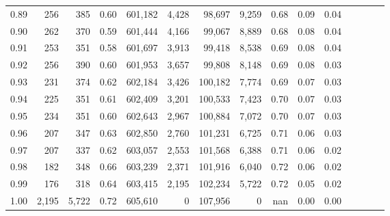 \begin{tabular}{rrrcrrrrrrrrrrr}
0.89 &     256 &    385 &                                       0.60 &  601,182 &    4,428 &   98,697 &    9,259 &  0.68 &  0.09 &                         0.04 \\
0.90 &     262 &    370 &                                       0.59 &  601,444 &    4,166 &   99,067 &    8,889 &  0.68 &  0.08 &                         0.04 \\
0.91 &     253 &    351 &                                       0.58 &  601,697 &    3,913 &   99,418 &    8,538 &  0.69 &  0.08 &                         0.04 \\
0.92 &     256 &    390 &                                       0.60 &  601,953 &    3,657 &   99,808 &    8,148 &  0.69 &  0.08 &                         0.03 \\
0.93 &     231 &    374 &                                       0.62 &  602,184 &    3,426 &  100,182 &    7,774 &  0.69 &  0.07 &                         0.03 \\
0.94 &     225 &    351 &                                       0.61 &  602,409 &    3,201 &  100,533 &    7,423 &  0.70 &  0.07 &                         0.03 \\
0.95 &     234 &    351 &                                       0.60 &  602,643 &    2,967 &  100,884 &    7,072 &  0.70 &  0.07 &                         0.03 \\
0.96 &     207 &    347 &                                       0.63 &  602,850 &    2,760 &  101,231 &    6,725 &  0.71 &  0.06 &                         0.03 \\
0.97 &     207 &    337 &                                       0.62 &  603,057 &    2,553 &  101,568 &    6,388 &  0.71 &  0.06 &                         0.02 \\
0.98 &     182 &    348 &                                       0.66 &  603,239 &    2,371 &  101,916 &    6,040 &  0.72 &  0.06 &                         0.02 \\
0.99 &     176 &    318 &                                       0.64 &  603,415 &    2,195 &  102,234 &    5,722 &  0.72 &  0.05 &                         0.02 \\
1.00 &   2,195 &  5,722 &                                       0.72 &  605,610 &        0 &  107,956 &        0 &   nan &  0.00 &                         0.00 \\
\bottomrule
\end{tabular}
